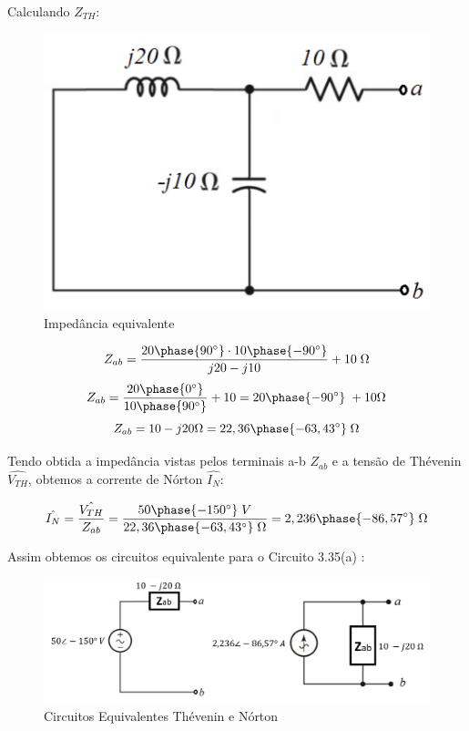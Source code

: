 \documentclass[
	12pt,				%
	oneside,			%
	a4paper,			%
	english,			%
	french,				%
	spanish,			%
	brazil				%
	]{abntex2}
\begin{document}
Calculando $Z_{TH}$:
\begin{paracol}{2}
\begin{figure}[htb]
	\centering
	\includegraphics[scale=0.5]{3-35(a).PNG}
	\caption{Impedância equivalente}
\end{figure}
\switchcolumn
$$Z_{ab} = \frac{20\phase{90^{\circ}}\cdot 10\phase{-90^{\circ}}}{j20-j10}+10\;\Omega$$
$$Z_{ab} = \frac{20\phase{0^{\circ}}}{10\phase{90^{\circ}}}+10=20\phase{-90^{\circ}}\;+10\Omega$$
$$Z_{ab} = 10-j20 \Omega = 22,36\phase{-63,43^{\circ}}\;\Omega$$
\end{paracol}
\newpage

Tendo obtida a impedância vistas pelos terminais a-b $Z_{ab}$ e a tensão de Thévenin $\hat{V_{TH}}$, obtemos a corrente de Nórton $\hat{I_N}:$

$$\hat{I_N} = \dfrac{\hat{V_{TH}}}{Z_{ab}}=\dfrac{50\phase{-150^{\circ}}\;V}{22,36\phase{-63,43^{\circ}}\;\Omega} = 2,236\phase{-86,57^{\circ}}\;\Omega$$

Assim obtemos os circuitos equivalente para o Circuito 3.35(a) :

\begin{figure}[htb]
	\centering
	\includegraphics[scale=0.35]{3-35(b).PNG}
	\caption{Circuitos Equivalentes Thévenin e Nórton}
\end{figure}
\end{document}
